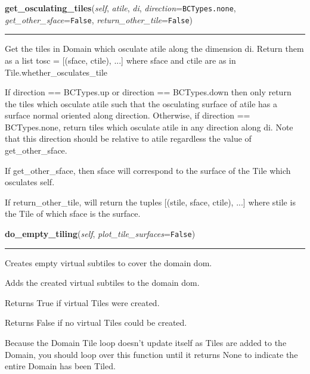 \hspace{.8\funcindent}\begin{boxedminipage}{\funcwidth}

    \raggedright \textbf{get\_osculating\_tiles}(\textit{self}, \textit{atile}, \textit{di}, \textit{direction}={\tt BCTypes.none}, \textit{get\_other\_sface}={\tt False}, \textit{return\_other\_tile}={\tt False})

    \vspace{-1.5ex}

    \rule{\textwidth}{0.5\fboxrule}
\setlength{\parskip}{2ex}
    Get the tiles in Domain which osculate atile along the dimension di. 
    Return them as a list tosc = [(sface, ctile), ...] where sface and 
    ctile are as in Tile.whether\_osculates\_tile

    If direction == BCTypes.up or direction == BCTypes.down then only 
    return the tiles which osculate atile such that the osculating surface 
    of atile has a surface normal oriented along direction. Otherwise, if 
    direction == BCTypes.none, return tiles which osculate atile in any 
    direction along di. Note that this direction should be relative to 
    atile regardless the value of get\_other\_sface.

    If get\_other\_sface, then sface will correspond to the surface of the 
    Tile which osculates self.

    If return\_other\_tile, will return the tuples [(stile, sface, ctile), 
    ...] where stile is the Tile of which sface is the surface.

\setlength{\parskip}{1ex}
    \end{boxedminipage}

    \label{Tiling:Domain:do_empty_tiling}

    \vspace{0.5ex}

\hspace{.8\funcindent}\begin{boxedminipage}{\funcwidth}

    \raggedright \textbf{do\_empty\_tiling}(\textit{self}, \textit{plot\_tile\_surfaces}={\tt False})

    \vspace{-1.5ex}

    \rule{\textwidth}{0.5\fboxrule}
\setlength{\parskip}{2ex}
    Creates empty virtual subtiles to cover the domain dom.

    Adds the created virtual subtiles to the domain dom.

    Returns True if virtual Tiles were created.

    Returns False if no virtual Tiles could be created.

    Because the Domain Tile loop doesn't update itself as Tiles are added 
    to the Domain, you should loop over this function until it returns None
    to indicate the entire Domain has been Tiled.

\setlength{\parskip}{1ex}
    \end{boxedminipage}

